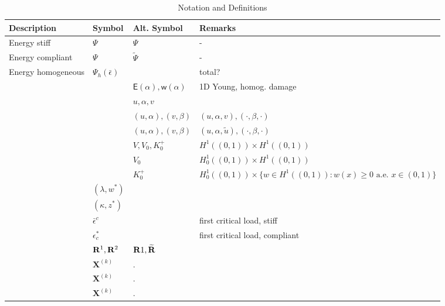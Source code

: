 


\newcommand{\Estiff}{\Psi}
\newcommand{\Ecompl}{\widetilde\Psi}
\newcommand{\subsu}{\tilde u}
\newcommand{\subsutest}{\tilde v}
\newcommand{\homogdiss}{\mathsf{w}}
\newcommand{\soften}{\mathsf{a}}
\newcommand{\damagell}{\ell}
\newcommand{\elastell}{\Lambda}
\newcommand{\stiffratio}{\rho}
\newcommand{\yhom}{y^{\text{hom}}}
\newcommand{\stiffmat}{\mathbf{H}}
\newcommand{\stiffmatcompl}{\widetilde{\mathbf{H}}}



\begin{table}[h!]
    \centering
    \begin{tabular}{  m{3.5cm}  m{3cm}  m{2.5cm}  m{6cm}  }
      \hline
      \textbf{Description} & \textbf{Symbol} & \textbf{Alt. Symbol} & \textbf{Remarks} \\
      \hline
      Energy stiff     & $\Psi$ & $\Estiff$ & - \\
      Energy compliant & $\Psi$ & $\Ecompl$ & - \\
      Energy homogeneous & $\Psi_h(\bar\epsilon)$ &  & total? \\
      & & $\mathsf E(\alpha), \homogdiss(\alpha)$ & 1D Young, homog. damage\\
      & & $u, \alpha, v$ & \\
      & & $(u,\alpha), (v, \beta)$ & $(u,\alpha, v), (\cdot, \beta, \cdot)$ \\
      & & $(u,\alpha), (v, \beta)$ & $(u,\alpha, \subsu), (\cdot, \beta, \cdot)$ \\
      & & $V, V_0, K^+_0$ & $H^1((0,1))\times  H^1((0,1))$\\
      & & $V_0$ & $H^1_0((0,1))\times  H^1((0,1))$\\
      & & $K^+_0$ & $H^1_0((0, 1))\times \{w \in H^1((0, 1)): w(x) \geq 0 \text{ a.e. }x\in (0, 1)\}$\\
      & $(\lambda, w^*)$ &  & \\
      & $(\kappa, z^*)$ &  & \\
      & $\bar \epsilon^c$ &  & first critical load, stiff\\
      & $\epsilon_c^*$ &  & first critical load, compliant \\
      & ${\bf R}^1, {\bf R}^2$ & ${\bf R}1, \widetilde{\bf R}$ & \\
      & $\mathbf{X}^{(k)}$ & $.$ & \\
      & $\mathbf{X}^{(k)}$ & $.$ & \\
      & $\mathbf{X}^{(k)}$ & $.$ & \\
    \end{tabular}
    \caption{Notation and Definitions}
\label{table:notation}
\end{table}

